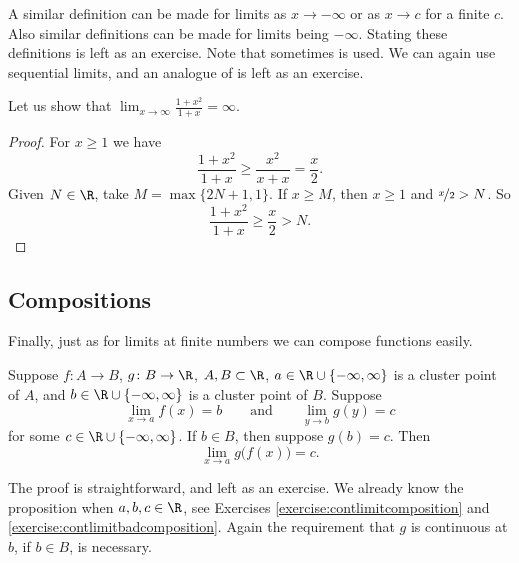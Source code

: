 \documentclass[12pt]{book}
\begin{document}
A similar definition can be made for limits as $x \to -\infty$
or as $x \to c$ for a finite $c$.
Also similar definitions can be
made for limits being $-\infty$.
Stating these definitions is left
as an exercise.
Note that
sometimes \emph{} is used.
We can again use sequential limits, and an analogue of 
 is left as an exercise.

\begin{example}
Let us show that $\lim_{x \to \infty} \frac{1+x^2}{1+x} = \infty$.

\begin{proof} For $x \geq 1$ we have
\begin{equation*}
\frac{1+x^2}{1+x} \geq 
\frac{x^2}{x+x}  = 
\frac{x}{2} .
\end{equation*}
Given $N \in \R$, take $M = \max \{ 2N+1 , 1 \}$.
If $x \geq M$, then $x \geq 1$ and $\nicefrac{x}{2} > N$.
So
\begin{equation*}
\frac{1+x^2}{1+x} \geq 
\frac{x}{2} > N .
\end{equation*}
\end{proof}
\end{example}

\subsection*{Compositions}

Finally, just as for limits at finite numbers we can compose functions
easily.

\begin{prop} \label{prop:inflimcompositions}
Suppose $f \colon A \to B$, $g \colon B \to \R$, $A, B \subset \R$, 
$a \in \R \cup \{ -\infty, \infty\}$ is a cluster point of $A$,
and $b \in \R \cup \{ -\infty, \infty\}$ is a cluster point of $B$.
Suppose 
\begin{equation*}
\lim_{x \to a} f(x) = b\qquad \text{and} \qquad \lim_{y \to b} g(y) = c
\end{equation*}
for some $c \in \R \cup \{ -\infty, \infty \}$.
If $b \in B$, then suppose $g(b) = c$.
Then
\begin{equation*}
\lim_{x \to a} g\bigl(f(x)\bigr) = c .
\end{equation*}
\end{prop}

The proof is straightforward, and left as an exercise.
We already
know the proposition when $a, b, c \in \R$, see Exercises
\ref{exercise:contlimitcomposition} and
\ref{exercise:contlimitbadcomposition}.
Again the requirement that $g$ is
continuous at $b$, if $b \in B$, is necessary.
\end{document}
